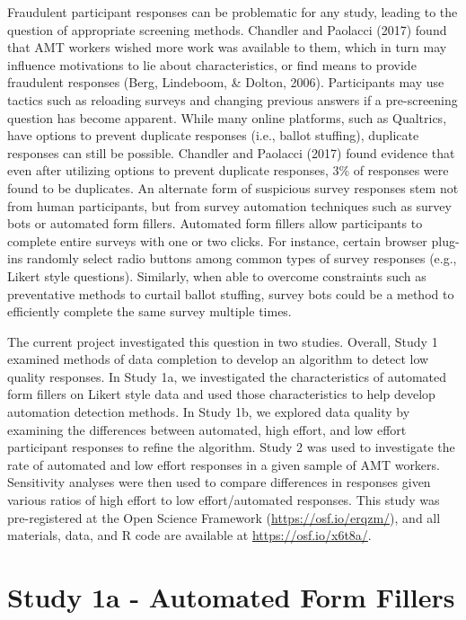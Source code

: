 \documentclass[english,man]{apa6}
\theoremstyle{definition}
\theoremstyle{definition}
\theoremstyle{definition}
\theoremstyle{remark}
\begin{document}
Fraudulent participant responses can be problematic for any study,
leading to the question of appropriate screening methods. Chandler and
Paolacci (2017) found that AMT workers wished more work was available to
them, which in turn may influence motivations to lie about
characteristics, or find means to provide fraudulent responses (Berg,
Lindeboom, \& Dolton, 2006). Participants may use tactics such as
reloading surveys and changing previous answers if a pre-screening
question has become apparent. While many online platforms, such as
Qualtrics, have options to prevent duplicate responses (i.e., ballot
stuffing), duplicate responses can still be possible. Chandler and
Paolacci (2017) found evidence that even after utilizing options to
prevent duplicate responses, 3\% of responses were found to be
duplicates. An alternate form of suspicious survey responses stem not
from human participants, but from survey automation techniques such as
survey bots or automated form fillers. Automated form fillers allow
participants to complete entire surveys with one or two clicks. For
instance, certain browser plug-ins randomly select radio buttons among
common types of survey responses (e.g., Likert style questions).
Similarly, when able to overcome constraints such as preventative
methods to curtail ballot stuffing, survey bots could be a method to
efficiently complete the same survey multiple times.

The current project investigated this question in two studies. Overall,
Study 1 examined methods of data completion to develop an algorithm to
detect low quality responses. In Study 1a, we investigated the
characteristics of automated form fillers on Likert style data and used
those characteristics to help develop automation detection methods. In
Study 1b, we explored data quality by examining the differences between
automated, high effort, and low effort participant responses to refine
the algorithm. Study 2 was used to investigate the rate of automated and
low effort responses in a given sample of AMT workers. Sensitivity
analyses were then used to compare differences in responses given
various ratios of high effort to low effort/automated responses. This
study was pre-registered at the Open Science Framework
(\url{https://osf.io/erqzm/}), and all materials, data, and R code are
available at \url{https://osf.io/x6t8a/}.

\section{Study 1a - Automated Form
Fillers}\label{study-1a---automated-form-fillers}
\end{document}
